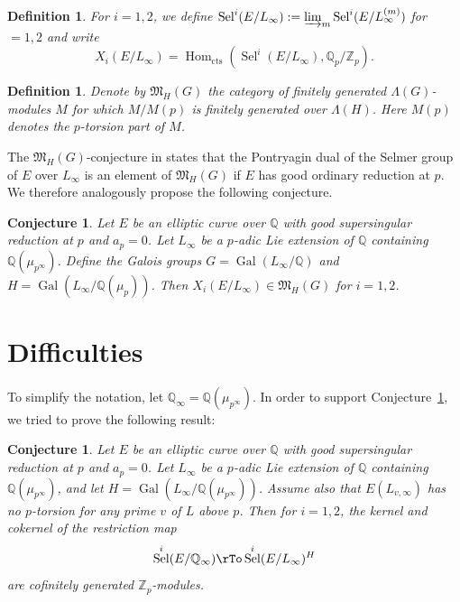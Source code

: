 \documentclass{amsart}
\newcommand{\QQ}{\mathbb Q}
\newcommand{\ZZ}{\mathbb Z}
\DeclareMathOperator{\Sel}{Sel}
\DeclareMathOperator{\Hom}{Hom}
\DeclareMathOperator{\Gal}{Gal}
\newcommand{\MHG}{{\mathfrak M}_H(G)}
\newtheorem{definition}[theorem]{Definition}
\newtheorem{conjecture}[theorem]{Conjecture}
\begin{document}
  \begin{definition}
   For $i=1,2$, we define $\Sel^i(E/L_\infty):=\varinjlim_m\Sel^i(E/L^{(m)}_\infty)$ for $=1,2$ and write
   \[ X_i(E\slash L_\infty)=\Hom_{\mathrm{cts}}\left(\Sel^i(E\slash L_\infty),\QQ_p\slash\ZZ_p\right). \]
  \end{definition}
  
  \begin{definition}
   Denote by $\mathfrak{M}_H(G)$ the category of finitely generated $\Lambda(G)$-modules $M$ for which $M\slash M(p)$ is finitely generated over $\Lambda(H)$. Here $M(p)$ denotes the $p$-torsion part of $M$. 
  \end{definition}
 
  The $\MHG$-conjecture in \cite{cfksv} states that the Pontryagin dual of the Selmer group of $E$ over $L_\infty$ is an element of $\MHG$ if $E$ has good ordinary reduction at $p$. We therefore analogously propose the following conjecture.
  
  \begin{conjecture}\label{con}
   Let $E$ be an elliptic curve over $\QQ$ with good supersingular reduction at $p$ and $a_p=0$. Let $L_\infty$ be a $p$-adic Lie extension of $\QQ$ containing $\QQ(\mu_{p^\infty})$. Define the Galois groups $G=\Gal(L_\infty\slash\QQ)$ and $H=\Gal(L_\infty\slash \QQ(\mu_p))$. Then $X_i(E\slash L_\infty)\in\mathfrak{M}_H(G)$ for $i=1,2$.
  \end{conjecture}
  


 \section{Difficulties}\label{cyclotomicshortexact}
 
  To simplify the notation, let $\QQ_\infty=\QQ(\mu_{p^\infty})$. In order to support Conjecture~\ref{con}, we tried to prove the following result:
      
  \begin{conjecture}\label{support}
   Let $E$ be an elliptic curve over $\QQ$ with good supersingular reduction at $p$ and $a_p=0$. Let $L_\infty$ be a $p$-adic Lie extension of $\QQ$ containing $\QQ(\mu_{p^\infty})$, and let $H=\Gal(L_\infty\slash \QQ(\mu_{p^\infty}))$. Assume also that $E(L_{v,\infty})$ has no $p$-torsion for any prime $v$ of $L$ above $p$.  Then for $i=1,2$, the kernel and cokernel of the restriction map 
   \[
   \Sel^i(E\slash \QQ_\infty)\rTo \Sel^i(E\slash L_\infty)^H
   \]
   are cofinitely generated $\ZZ_p$-modules. 
  \end{conjecture}
  
\end{document}
